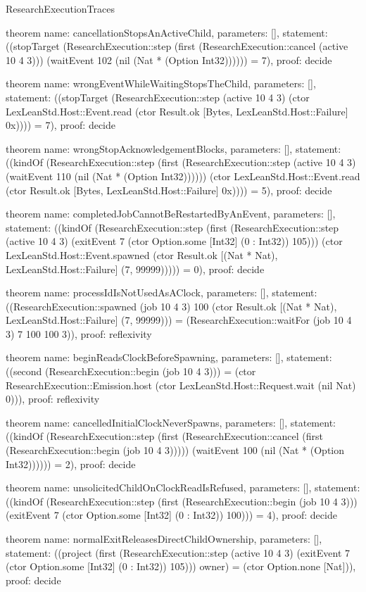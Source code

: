\begin{lexlean}{ResearchExecutionTraces}
\begin{semanticmodule}
theorem{
  name: cancellationStopsAnActiveChild,
  parameters: [],
  statement: ((stopTarget (ResearchExecution::step (first (ResearchExecution::cancel (active 10 4 3))) (waitEvent 102 (nil (Nat * (Option Int32)))))) = 7),
  proof: decide{}
}

theorem{
  name: wrongEventWhileWaitingStopsTheChild,
  parameters: [],
  statement: ((stopTarget (ResearchExecution::step (active 10 4 3) (ctor LexLeanStd.Host::Event.read (ctor Result.ok [Bytes, LexLeanStd.Host::Failure] 0x)))) = 7),
  proof: decide{}
}

theorem{
  name: wrongStopAcknowledgementBlocks,
  parameters: [],
  statement: ((kindOf (ResearchExecution::step (first (ResearchExecution::step (active 10 4 3) (waitEvent 110 (nil (Nat * (Option Int32)))))) (ctor LexLeanStd.Host::Event.read (ctor Result.ok [Bytes, LexLeanStd.Host::Failure] 0x)))) = 5),
  proof: decide{}
}

theorem{
  name: completedJobCannotBeRestartedByAnEvent,
  parameters: [],
  statement: ((kindOf (ResearchExecution::step (first (ResearchExecution::step (active 10 4 3) (exitEvent 7 (ctor Option.some [Int32] (0 : Int32)) 105))) (ctor LexLeanStd.Host::Event.spawned (ctor Result.ok [(Nat * Nat), LexLeanStd.Host::Failure] (7, 99999))))) = 0),
  proof: decide{}
}

theorem{
  name: processIdIsNotUsedAsAClock,
  parameters: [],
  statement: ((ResearchExecution::spawned (job 10 4 3) 100 (ctor Result.ok [(Nat * Nat), LexLeanStd.Host::Failure] (7, 99999))) = (ResearchExecution::waitFor (job 10 4 3) 7 100 100 3)),
  proof: reflexivity{}
}

theorem{
  name: beginReadsClockBeforeSpawning,
  parameters: [],
  statement: ((second (ResearchExecution::begin (job 10 4 3))) = (ctor ResearchExecution::Emission.host (ctor LexLeanStd.Host::Request.wait (nil Nat) 0))),
  proof: reflexivity{}
}

theorem{
  name: cancelledInitialClockNeverSpawns,
  parameters: [],
  statement: ((kindOf (ResearchExecution::step (first (ResearchExecution::cancel (first (ResearchExecution::begin (job 10 4 3))))) (waitEvent 100 (nil (Nat * (Option Int32)))))) = 2),
  proof: decide{}
}

theorem{
  name: unsolicitedChildOnClockReadIsRefused,
  parameters: [],
  statement: ((kindOf (ResearchExecution::step (first (ResearchExecution::begin (job 10 4 3))) (exitEvent 7 (ctor Option.some [Int32] (0 : Int32)) 100))) = 4),
  proof: decide{}
}

theorem{
  name: normalExitReleasesDirectChildOwnership,
  parameters: [],
  statement: ((project (first (ResearchExecution::step (active 10 4 3) (exitEvent 7 (ctor Option.some [Int32] (0 : Int32)) 105))) owner) = (ctor Option.none [Nat])),
  proof: decide{}
}

\end{semanticmodule}
\end{lexlean}
